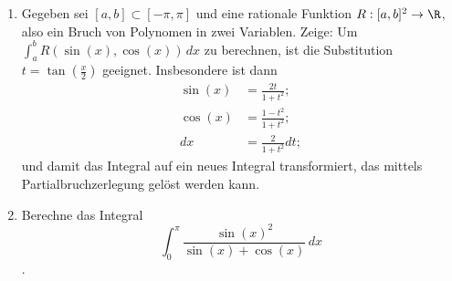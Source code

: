\begin{prob} 
\begin{enumerate}[label=(\alph*)]
\item Gegeben sei $[a,b]\subset[-\pi,\pi]$ und eine rationale Funktion $R:[a,b]^2\to \R$, also ein Bruch von Polynomen in zwei Variablen. Zeige: Um $\int_a^b R(\sin(x),\cos(x))\,dx$ zu berechnen, ist die Substitution $t=\tan(\frac{x}{2})$ geeignet. Insbesondere ist dann 
\begin{equation*}
\begin{split}
\sin(x)&=\frac{2t}{1+t^2};\\
\cos(x)&=\frac{1-t^2}{1+t^2};\\
dx&=\frac{2}{1+t^2}dt;
\end{split}
\end{equation*}
und damit das Integral auf ein neues Integral transformiert, das mittels Partialbruchzerlegung gelöst werden kann.
\item Berechne das Integral 
$$\int_0^\pi \frac{\sin(x)^2}{\sin(x)+\cos(x)}\,dx$$.
\end{enumerate}
\end{prob}
